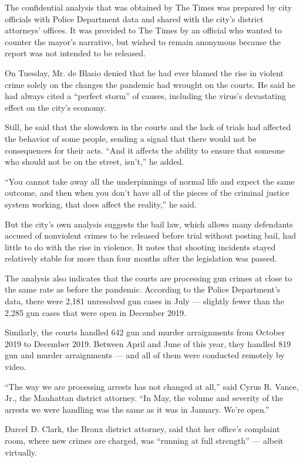 The confidential analysis that was obtained by The Times was prepared by
city officials with Police Department data and shared with the city's
district attorneys' offices. It was provided to The Times by an official
who wanted to counter the mayor's narrative, but wished to remain
anonymous because the report was not intended to be released.

On Tuesday, Mr. de Blasio denied that he had ever blamed the rise in
violent crime solely on the changes the pandemic had wrought on the
courts. He said he had always cited a ``perfect storm'' of causes,
including the virus's devastating effect on the city's economy.

Still, he said that the slowdown in the courts and the lack of trials
had affected the behavior of some people, sending a signal that there
would not be consequences for their acts. ``And it affects the ability
to ensure that someone who should not be on the street, isn't,'' he
added.

``You cannot take away all the underpinnings of normal life and expect
the same outcome, and then when you don't have all of the pieces of the
criminal justice system working, that does affect the reality,'' he
said.

But the city's own analysis suggests the bail law, which allows many
defendants accused of nonviolent crimes to be released before trial
without posting bail, had little to do with the rise in violence. It
notes that shooting incidents stayed relatively stable for more than
four months after the legislation was passed.

The analysis also indicates that the courts are processing gun crimes at
close to the same rate as before the pandemic. According to the Police
Department's data, there were 2,181 unresolved gun cases in July ---
slightly fewer than the 2,285 gun cases that were open in December 2019.

Similarly, the courts handled 642 gun and murder arraignments from
October 2019 to December 2019. Between April and June of this year, they
handled 819 gun and murder arraignments --- and all of them were
conducted remotely by video.

``The way we are processing arrests has not changed at all,'' said Cyrus
R. Vance, Jr., the Manhattan district attorney. ``In May, the volume and
severity of the arrests we were handling was the same as it was in
January. We're open.''

Darcel D. Clark, the Bronx district attorney, said that her office's
complaint room, where new crimes are charged, was ``running at full
strength'' --- albeit virtually.

